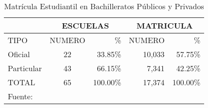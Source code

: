 \begin{table}[t]
	\centering
    \caption{Matr\'icula Estudiantil en Bachilleratos P\'ublicos y Privados}
    \label{tbl:SEG:MatriculaPublicoPrivado}
    \begin{tabular}{l||c|r||r|r}
                   & \multicolumn{2}{c||}{ESCUELAS}
                        & \multicolumn{2}{c}{MATRICULA}    \\
        \hline
        TIPO       & NUMERO & \%       & NUMERO & \%       \\
        \hline
        \hline
        Oficial    & 22     &  33.85\% & 10,033 &  57.75\% \\
        Particular & 43     &  66.15\% &  7,341 &  42.25\% \\
        TOTAL      & 65     & 100.00\% & 17,374 & 100.00\% \\
        \hline
        \multicolumn{5}{l}{Fuente: \citep{Seg2010}}
    \end{tabular}
\end{table}
